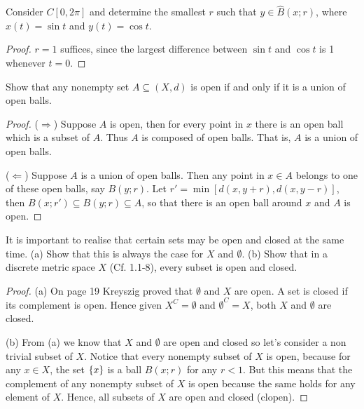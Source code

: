 \begin{exercise}{3}
Consider $C[0,2\pi]$ and determine the smallest $r$ such that $y\in \hat{B}(x;r)$, where $x(t)=\sin t$ and $y(t)=\cos t$.
\end{exercise}
\begin{proof}
$r=1$ suffices, since the largest difference between $\sin t$ and $\cos t$ is 1 whenever $t=0$.
\end{proof}

\begin{exercise}{4}
Show that any nonempty set $A\subseteq (X,d)$ is open if and only if it is a union of open balls.
\end{exercise}
\begin{proof}
($\Rightarrow$) Suppose $A$ is open, then for every point in $x$ there is an open ball which is a subset of $A$. Thus $A$ is composed of open balls. That is, $A$ is a union of open balls.

($\Leftarrow$) Suppose $A$ is a union of open balls. Then any point in $x\in A$ belongs to one of these open balls, say $B(y;r)$. Let $r'=\min[d(x,y+r), d(x,y-r)]$, then $B(x;r')\subseteq B(y;r)\subseteq A$, so that there is an open ball around $x$ and $A$ is open.
\end{proof}

\begin{exercise}{5}
It is important to realise that certain sets may be open and closed at the same time. (a) Show that this is always the case for $X$ and $\emptyset$. (b) Show that in a discrete metric space $X$ (Cf. 1.1-8), every subset is open and closed.
\end{exercise}
\begin{proof}
(a) On page 19 Kreyszig proved that $\emptyset$ and $X$ are open. A set is closed if its complement is open. Hence given $X^C=\emptyset$ and $\emptyset^C=X$, both $X$ and $\emptyset$ are closed.

(b) From (a) we know that $X$ and $\emptyset$ are open and closed so let's consider a non trivial subset of $X$. Notice that every nonempty subset of $X$ is open, because for any $x\in X$, the set $\{x\}$ is a ball $B(x; r)$ for any $r<1$. But this means that the complement of any nonempty subset of $X$ is open because the same holds for any element of $X$. Hence, all subsets of $X$ are open and closed (clopen).
\end{proof}

